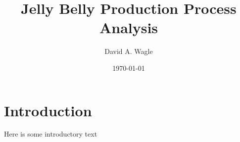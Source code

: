 \documentclass[man]{apa7}
\affiliation{North Central University}
\author{David A. Wagle}
\date{\today}
\title{Jelly Belly Production Process Analysis}
\begin{document}
\maketitle




\section{Introduction}
\label{sec:orgbcda638}

Here is some introductory text
\end{document}
